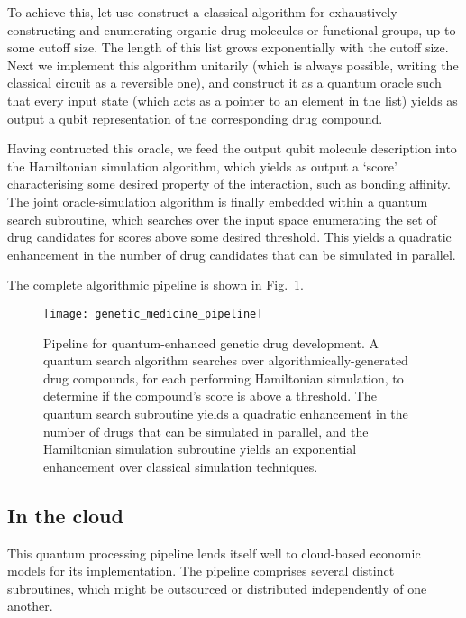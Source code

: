 To achieve this, let use construct a classical algorithm for exhaustively constructing and enumerating organic drug molecules or functional groups, up to some cutoff size. The length of this list grows exponentially with the cutoff size. Next we implement this algorithm unitarily (which is always possible, writing the classical circuit as a reversible one), and construct it as a quantum oracle such that every input state (which acts as a pointer to an element in the list) yields as output a qubit representation of the corresponding drug compound.

Having contructed this oracle, we feed the output qubit molecule description into the Hamiltonian simulation algorithm, which yields as output a `score' characterising some desired property of the interaction, such as bonding affinity. The joint oracle-simulation algorithm is finally embedded within a quantum search subroutine, which searches over the input space enumerating the set of drug candidates for scores above some desired threshold. This yields a quadratic enhancement in the number of drug candidates that can be simulated in parallel.

The complete algorithmic pipeline is shown in Fig.~\ref{fig:genetic_med_pipe}.

\begin{figure}[!htb]
	\texttt{[image: genetic\_medicine\_pipeline]}
	\caption{Pipeline for quantum-enhanced genetic drug development. A quantum search algorithm searches over algorithmically-generated drug compounds, for each performing Hamiltonian simulation, to determine if the compound's score is above a threshold. The quantum search subroutine yields a quadratic enhancement in the number of drugs that can be simulated in parallel, and the Hamiltonian simulation subroutine yields an exponential enhancement over classical simulation techniques.} \label{fig:genetic_med_pipe}
\end{figure}

%
%

\subsection{In the cloud}

This quantum processing pipeline lends itself well to cloud-based economic models for its implementation. The pipeline comprises several distinct subroutines, which might be outsourced or distributed independently of one another.

